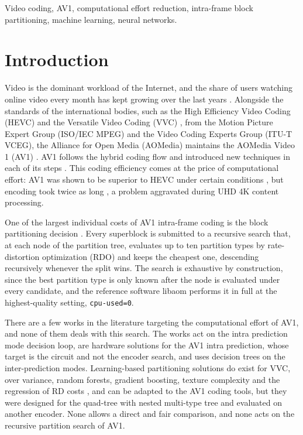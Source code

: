 \documentclass[conference]{IEEEtran}
\begin{document}
\begin{IEEEkeywords}
Video coding, AV1, computational effort reduction, intra-frame block
partitioning, machine learning, neural networks.
\end{IEEEkeywords}

\section{Introduction}
\label{sec_intro}

Video is the dominant workload of the Internet, and the share of users watching
online video every month has kept growing over the last years \cite{statista}.
Alongside the standards of the international bodies, such as the High Efficiency
Video Coding (HEVC) \cite{hevc} and the Versatile Video Coding (VVC) \cite{vvc},
from the Motion Picture Expert Group (ISO/IEC MPEG) and the Video Coding Experts
Group (ITU-T VCEG), the Alliance for Open Media (AOMedia) maintains the AOMedia
Video 1 (AV1) \cite{av1site}. AV1 follows the hybrid coding flow and introduced
new techniques in each of its steps \cite{han2021,chen2018}. This coding
efficiency comes at the price of computational effort: AV1 was shown to be
superior to HEVC under certain conditions \cite{grois2016}, but encoding took
twice as long \cite{layek2017}, a problem aggravated during UHD 4K content
processing.

One of the largest individual costs of AV1 intra-frame coding is the block
partitioning decision \cite{bender2023}. Every superblock is submitted to a
recursive search that,
at each node of the partition tree, evaluates up to ten partition types by
rate-distortion optimization (RDO) \cite{sullivan1998} and keeps the cheapest one,
descending recursively whenever the split wins. The search is exhaustive by
construction, since the best partition type is only known after the node is
evaluated under every candidate, and the reference software libaom \cite{libaom}
performs it in full at the highest-quality setting, \texttt{cpu-used=0}.

There are a few works in the literature targeting the computational effort of
AV1, and none of them deals with this search. The works \cite{xu2020,xu2021,%
jeong2019} act on the intra prediction mode decision loop, \cite{correa2020,%
netto2022} are hardware solutions for the AV1 intra prediction, whose target is
the circuit and not the encoder search, and \cite{kim2019} uses decision trees on
the inter-prediction modes. Learning-based partitioning solutions do exist for
VVC, over variance, random forests, gradient boosting, texture complexity and
the regression of RD costs \cite{saldanha2022,he2021,chen2019,song2024,%
kherchouche2024,kherchouche2025}, and can be adapted to the AV1 coding tools,
but they were designed for the quad-tree with nested multi-type tree and
evaluated on another encoder. None allows a direct and fair comparison, and none
acts on the recursive partition search of AV1.
\end{document}
